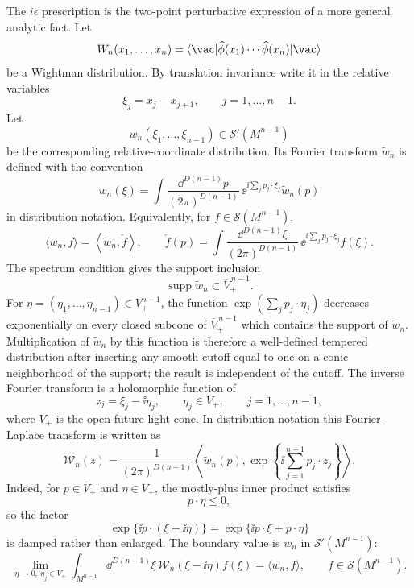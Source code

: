 \begin{proposition}
\label{prop:forward-tube-analyticity-spectrum-condition}
The \(i\epsilon\) prescription is the two-point perturbative expression of a
more general analytic fact.  Let
\[
  W_n(x_1,\ldots,x_n)
  =
  \langle \vac|
  \widehat\phi(x_1)\cdots\widehat\phi(x_n)
  |\vac\rangle
\]
be a Wightman distribution.  By translation invariance write it in the
relative variables
\[
  \xi_j=x_j-x_{j+1},
  \qquad j=1,\ldots,n-1.
\]
Let
\[
  w_n(\xi_1,\ldots,\xi_{n-1})\in\mathcal S'(M^{n-1})
\]
be the corresponding relative-coordinate distribution.  Its Fourier transform
\(\widetilde w_n\) is defined with the convention
\[
  w_n(\xi)
  =
  \int\frac{\dd^{D(n-1)}p}{(2\pi)^{D(n-1)}}\,
  \ee^{\ii\sum_j p_j\cdot\xi_j}\widetilde w_n(p)
\]
in distribution notation.  Equivalently, for \(f\in\mathcal S(M^{n-1})\),
\[
  \langle w_n,f\rangle
  =
  \left\langle \widetilde w_n,\check f\right\rangle,
  \qquad
  \check f(p)
  =
  \int\frac{\dd^{D(n-1)}\xi}{(2\pi)^{D(n-1)}}\,
  \ee^{\ii\sum_jp_j\cdot\xi_j}f(\xi).
\]
The spectrum condition gives the support inclusion
\[
  \operatorname{supp}\widetilde w_n
  \subset
  \overline V_+^{\,n-1}.
\]
For \(\eta=(\eta_1,\ldots,\eta_{n-1})\in V_+^{n-1}\), the function
\(\exp(\sum_j p_j\cdot\eta_j)\) decreases exponentially on every closed
subcone of \(\overline V_+^{\,n-1}\) which contains the support of
\(\widetilde w_n\).  Multiplication of \(\widetilde w_n\) by this function is
therefore a well-defined tempered distribution after inserting any smooth
cutoff equal to one on a conic neighborhood of the support; the result is
independent of the cutoff.  The inverse Fourier transform is a holomorphic
function of
\begin{equation}
  z_j=\xi_j-\ii\eta_j,
  \qquad
  \eta_j\in V_+,\qquad j=1,\ldots,n-1,
  \label{eq:wightman-forward-tube}
\end{equation}
where \(V_+\) is the open future light cone.  In distribution notation this
Fourier-Laplace transform is written as
\[
  \mathcal W_n(z)
  =
  \frac{1}{(2\pi)^{D(n-1)}}
  \left\langle
    \widetilde w_n(p),
    \exp\!\left\{\ii\sum_{j=1}^{n-1}p_j\cdot z_j\right\}
  \right\rangle .
\]
Indeed, for
\(p\in\overline V_+\) and \(\eta\in V_+\), the mostly-plus inner product
satisfies
\[
  p\cdot\eta\le0,
\]
so the factor
\[
  \exp\{\ii p\cdot(\xi-\ii\eta)\}
  =
  \exp\{\ii p\cdot\xi+p\cdot\eta\}
\]
is damped rather than enlarged.
The boundary value is \(w_n\) in \(\mathcal S'(M^{n-1})\):
\[
  \lim_{\eta\to0,\ \eta_j\in V_+}
  \int_{M^{n-1}}\dd^{D(n-1)}\xi\,
  \mathcal W_n(\xi-\ii\eta)f(\xi)
  =
  \langle w_n,f\rangle,
  \qquad f\in\mathcal S(M^{n-1}).
\]
\end{proposition}

